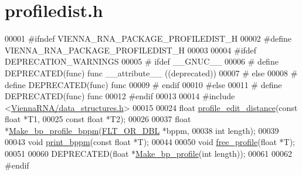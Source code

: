 \hypertarget{profiledist_8h_source}{}\section{profiledist.\+h}
\label{profiledist_8h_source}

\begin{DoxyCode}
00001 \textcolor{preprocessor}{#ifndef VIENNA\_RNA\_PACKAGE\_PROFILEDIST\_H}
00002 \textcolor{preprocessor}{#define VIENNA\_RNA\_PACKAGE\_PROFILEDIST\_H}
00003 
00004 \textcolor{preprocessor}{#ifdef DEPRECATION\_WARNINGS}
00005 \textcolor{preprocessor}{# ifdef \_\_GNUC\_\_}
00006 \textcolor{preprocessor}{#  define DEPRECATED(func) func \_\_attribute\_\_ ((deprecated))}
00007 \textcolor{preprocessor}{# else}
00008 \textcolor{preprocessor}{#  define DEPRECATED(func) func}
00009 \textcolor{preprocessor}{# endif}
00010 \textcolor{preprocessor}{#else}
00011 \textcolor{preprocessor}{# define DEPRECATED(func) func}
00012 \textcolor{preprocessor}{#endif}
00013 
00014 \textcolor{preprocessor}{#include <\hyperlink{data__structures_8h}{ViennaRNA/data\_structures.h}>}
00015 
00024 \textcolor{keywordtype}{float} \hyperlink{profiledist_8h_abe75e90e00a1e5dd8862944ed53dad5d}{profile\_edit\_distance}(\textcolor{keyword}{const} \textcolor{keywordtype}{float} *T1,
00025                             \textcolor{keyword}{const} \textcolor{keywordtype}{float} *T2);
00026 
00037 \textcolor{keywordtype}{float} *\hyperlink{profiledist_8h_a3dff26e707a2a2e65a0f759caabde6e7}{Make\_bp\_profile\_bppm}(\hyperlink{group__data__structures_ga31125aeace516926bf7f251f759b6126}{FLT\_OR\_DBL} *bppm,
00038                             \textcolor{keywordtype}{int} length);
00039 
00043 \textcolor{keywordtype}{void}  \hyperlink{profiledist_8h_a8e0b4fe3698b3502945116ecc0ba6160}{print\_bppm}(\textcolor{keyword}{const} \textcolor{keywordtype}{float} *T);
00044 
00050 \textcolor{keywordtype}{void}  \hyperlink{profiledist_8h_a9b0b84a5a45761bf42d7c835dcdb3b85}{free\_profile}(\textcolor{keywordtype}{float} *T);
00051 
00060 DEPRECATED(\textcolor{keywordtype}{float} *\hyperlink{profiledist_8h_a904c7eaf4a2413567c00ac4891749d18}{Make\_bp\_profile}(\textcolor{keywordtype}{int} length));
00061 
00062 \textcolor{preprocessor}{#endif}
\end{DoxyCode}
